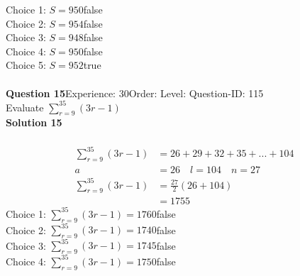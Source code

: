 \documentclass{article}
\begin{document}
Choice 1: \hspace{20pt}$S=950$\hspace{20pt}false\\
Choice 2: \hspace{20pt}$S=954$\hspace{20pt}false\\
Choice 3: \hspace{20pt}$S=948$\hspace{20pt}false\\
Choice 4: \hspace{20pt}$S=950$\hspace{20pt}false\\
Choice 5: \hspace{20pt}$S=952$\hspace{20pt}true\\
\\[4pt]
\noindent\textbf{Question 15}\hspace{20pt}Experience: 30\hspace{20pt}Order: \hspace{20pt}Level: \hspace{20pt}Question-ID: 115\\[2pt]
Evaluate $\displaystyle\sum_{r=9}^{35} (3r-1)$\\[4pt]
\noindent\textbf{Solution 15}\\[2pt]
\\[-35pt]\begin{align*}
\displaystyle\sum_{r=9}^{35} (3r-1)&=26+29+32+35+...+104\\[2pt]
a&=26\quad l=104 \quad n=27\\[2pt]
\displaystyle\sum_{r=9}^{35} (3r-1)&=\displaystyle\frac{27}{2}(26+104)\\[2pt]
&=1755
\end{align*}
Choice 1: \hspace{20pt}$\displaystyle\sum_{r=9}^{35} (3r-1)=1760$\hspace{20pt}false\\
Choice 2: \hspace{20pt}$\displaystyle\sum_{r=9}^{35} (3r-1)=1740$\hspace{20pt}false\\
Choice 3: \hspace{20pt}$\displaystyle\sum_{r=9}^{35} (3r-1)=1745$\hspace{20pt}false\\
Choice 4: \hspace{20pt}$\displaystyle\sum_{r=9}^{35} (3r-1)=1750$\hspace{20pt}false\\
\end{document}
